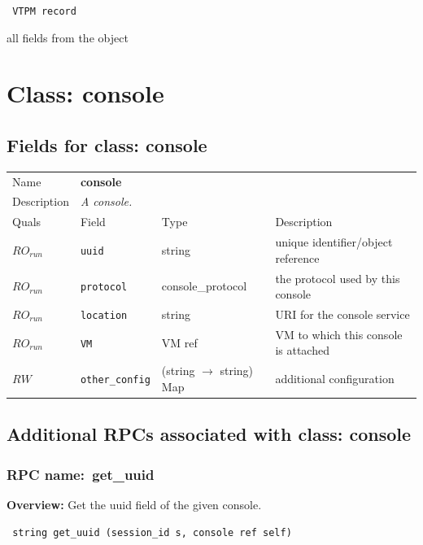 \vspace{0.3cm}

{\tt 
VTPM record
}


all fields from the object
\vspace{0.3cm}
\vspace{0.3cm}
\vspace{0.3cm}

\vspace{1cm}
\newpage
\section{Class: console}
\subsection{Fields for class: console}
\begin{longtable}{|lllp{}|}
\hline
\multicolumn{1}{|l}{Name} & \multicolumn{3}{l|}{\bf console} \\
\multicolumn{1}{|l}{Description} & \multicolumn{3}{l|}{\parbox{11cm}{\em A
console.}} \\
\hline
Quals & Field & Type & Description \\
\hline
$\mathit{RO}_\mathit{run}$ &  {\tt uuid} & string & unique identifier/object reference \\
$\mathit{RO}_\mathit{run}$ &  {\tt protocol} & console\_protocol & the protocol used by this console \\
$\mathit{RO}_\mathit{run}$ &  {\tt location} & string & URI for the console service \\
$\mathit{RO}_\mathit{run}$ &  {\tt VM} & VM ref & VM to which this console is attached \\
$\mathit{RW}$ &  {\tt other\_config} & (string $\rightarrow$ string) Map & additional configuration \\
\hline
\end{longtable}
\subsection{Additional RPCs associated with class: console}
\subsubsection{RPC name:~get\_uuid}

{\bf Overview:} 
Get the uuid field of the given console.

\begin{verbatim} string get_uuid (session_id s, console ref self)\end{verbatim}


